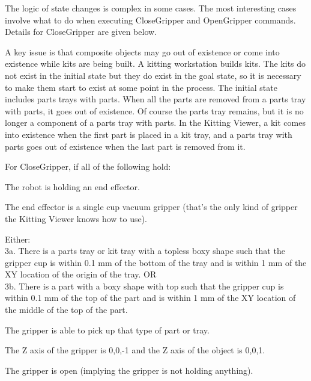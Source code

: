 The logic of state changes is complex in some cases. The most interesting
cases involve what to do when executing CloseGripper and OpenGripper
commands. Details for CloseGripper are given below. 

A key issue is that composite objects may go out of existence or come into
existence while kits are being built. A kitting workstation builds kits.
The kits do not exist in the initial state but they do exist in the goal
state, so it is necessary to make them start to exist at some point in the
process. The initial state includes parts trays with parts. When all the
parts are removed from a parts tray with parts, it goes out of existence.
Of course the parts tray remains, but it is no longer a component of a
parts tray with parts. In the Kitting Viewer, a kit comes into existence
when the first part is placed in a kit tray, and a parts tray with parts
goes out of existence when the last part is removed from it.

For CloseGripper, if all of the following hold:
\begin{list}{.}%
{}

\item  The robot is holding an end effector.

\item  The end effector is a single cup vacuum gripper (that's the only
   kind of gripper the Kitting Viewer knows how to use).

\item Either:\\
3a. There is a parts tray or kit tray with a topless boxy shape
    such that the gripper cup is within 0.1 mm of the bottom of the
    tray and is within 1 mm of the XY location of the origin of the tray. OR\\
3b. There is a part with a boxy shape with top such that the gripper cup
    is within 0.1 mm of the top of the part and is within 1 mm of the XY
    location of the middle of the top of the part.

\item The gripper is able to pick up that type of part or tray.

\item The Z axis of the gripper is 0,0,-1 and the Z axis of the object is
    0,0,1.

\item The gripper is open (implying the gripper is not holding anything).

\end{list}


